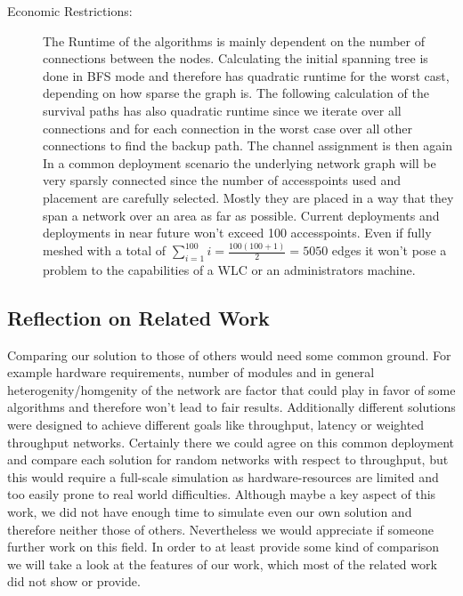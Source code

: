 \begin{description}
	\item[Economic Restrictions:]
	  The Runtime of the algorithms is mainly dependent on the number of connections between the nodes. Calculating the initial spanning tree is done in BFS mode and 
	  therefore has quadratic runtime for the worst cast, depending on how sparse the graph is. The following calculation of the survival paths has also quadratic runtime 
	  since we iterate over all connections and for each connection in the worst case over all other connections to find the backup path. The channel assignment is then again
	  In a common deployment scenario the underlying network graph will be very sparsly connected since the number of accesspoints used and placement are carefully selected.
	  Mostly they are placed in a way that they span a network over an area as far as possible.
	  Current deployments and deployments in near future won't exceed 100 accesspoints. 
	  Even if fully meshed with a total of \(\sum \limits_{i=1}^{100} i = \frac{100(100+1)}{2}=5050\)
	  edges it won't pose a problem to the capabilities of a WLC or an administrators machine.
	  
      \end{description}
      
\newpage
      
    \subsection{Reflection on Related Work}
      Comparing our solution to those of others would need some common ground. For example hardware requirements, number of modules and in general heterogenity/homgenity of
      the network are factor that could play in favor of some algorithms and therefore won't lead to fair results. Additionally different solutions were designed to 
      achieve different goals like throughput, latency or weighted throughput networks. Certainly there we could agree on this common deployment and compare each solution for random
      networks with respect to throughput, but this would require a full-scale simulation as hardware-resources are limited and too easily prone to real world difficulties.
      Although maybe a key aspect of this work, we did not have enough time to simulate even our own solution and therefore neither those of others. Nevertheless we would appreciate
      if someone further work on this field. In order to at least provide some kind of comparison we will take a look at the features of our work, which 
      most of the related work did not show or provide.
      
